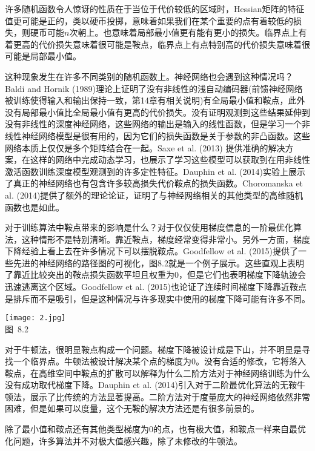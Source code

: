许多随机函数令人惊讶的性质在于当位于代价较低的区域时，Hessian矩阵的特征值更可能是正的，类以硬币投掷，意味着如果我们在某个重要的点有着较低的损失，则硬币可能$n$次朝上。也意味着局部最小值更有能有更小的损失。临界点上有着更高的代价损失意味着很可能是鞍点，临界点上有点特别高的代价损失意味着很可能是局部最小值。

这种现象发生在许多不同类别的随机函数上。神经网络也会遇到这种情况吗？Baldi and Hornik (1989)理论上证明了没有非线性的浅自动编码器(前馈神经网络被训练使得输入和输出保持一致，第14章有相关说明)有全局最小值和鞍点，此外没有局部最小值比全局最小值有更高的代价损失。没有证明观测到这些结果延伸到没有非线性的深度神经网络，这些网络的输出是输入的线性函数，但是学习一个非线性神经网络模型是很有用的，因为它们的损失函数是关于参数的非凸函数。这些网络本质上仅仅是多个矩阵结合在一起。Saxe et al. (2013) 提供准确的解决方案，在这样的网络中完成动态学习，也展示了学习这些模型可以获取到在用非线性激活函数训练深度模型观测到的许多定性特征。Dauphin et al. (2014)实验上展示了真正的神经网络也有包含许多较高损失代价鞍点的损失函数。Choromanska et al. (2014)提供了额外的理论论证，证明了与神经网络相关的其他类型的高维随机函数也是如此。

对于训练算法中鞍点带来的影响是什么？对于仅仅使用梯度信息的一阶最优化算法，这种情形不是特别清晰。靠近鞍点，梯度经常变得非常小。另外一方面，梯度下降经验上看上去在许多情况下可以摆脱鞍点。Goodfellow et al. (2015)提供了一些先进的神经网络的路径图的可视化，图8.2就是一个例子展示。这些直观上表明了靠近比较突出的鞍点损失函数平坦且权重为0，但是它们也表明梯度下降轨迹会迅速逃离这个区域。Goodfellow et al. (2015)也论证了连续时间梯度下降靠近鞍点是排斥而不是吸引，但是这种情况与许多现实中使用的梯度下降可能有许多不同。

\begin{center}
\texttt{[image: 2.jpg]}\\
图~8.2
\end{center}

对于牛顿法，很明显鞍点构成一个问题。梯度下降被设计成是下山，并不明显是寻找一个临界点。牛顿法被设计解决某个点的梯度为0。没有合适的修改，它将落入鞍点，在高维空间中鞍点的扩散可以解释为什么二阶方法对于神经网络训练为什么没有成功取代梯度下降。Dauphin et al. (2014)引入对于二阶最优化算法的无鞍牛顿法，展示了比传统的方法显著提高。二阶方法对于度量庞大的神经网络依然非常困难，但是如果可以度量，这个无鞍的解决方法还是有很多前景的。

除了最小值和鞍点还有其他类型梯度为0的点，也有极大值，和鞍点一样来自最优化问题，许多算法并不对极大值感兴趣，除了未修改的牛顿法。

